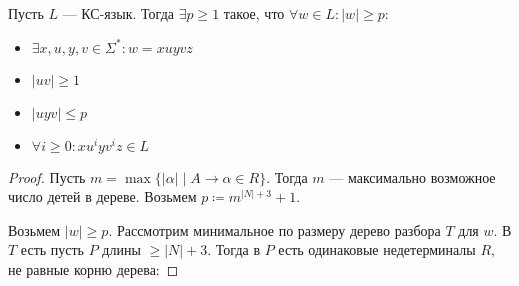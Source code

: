 \begin{lemma}[о накачке]
  Пусть $L$ --- КС-язык. Тогда $\exists p \geq 1$ такое, что $\forall w \in L\colon |w| \geq p$:
  \begin{itemize}
    \item $\exists x, u, y, v \in \Sigma^{*}\colon w = x u y v z$
    \item $|uv| \geq 1$
    \item $|uyv| \leq p$
    \item $\forall i \geq 0\colon xu^iyv^iz \in L$
  \end{itemize}
\end{lemma}
\begin{proof} Пусть $m = \max \{|\alpha| \; | \; A \to \alpha \in R\}$. Тогда $m$ --- максимально возможное число детей в дереве. Возьмем $p \coloneqq m^{|N| + 3} + 1$. 

Возьмем $|w| \geq p$. Рассмотрим минимальное по размеру дерево разбора $T$ для $w$. В $T$ есть пусть $P$ длины $\geq |N| + 3$. Тогда в $P$ есть одинаковые недетерминалы $R$, не равные корню дерева:


\center
\begin{tikzpicture}[x=0.75pt,y=0.75pt,yscale=-1,xscale=1]


\end{tikzpicture}
\end{proof}

